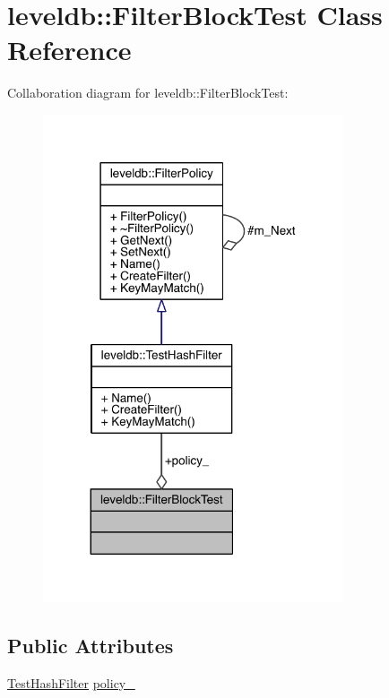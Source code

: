 \hypertarget{classleveldb_1_1_filter_block_test}{}\section{leveldb\+:\+:Filter\+Block\+Test Class Reference}
\label{classleveldb_1_1_filter_block_test}


Collaboration diagram for leveldb\+:\+:Filter\+Block\+Test\+:\nopagebreak
\begin{figure}[H]
\begin{center}
\leavevmode
\includegraphics[width=251pt]{classleveldb_1_1_filter_block_test__coll__graph}
\end{center}
\end{figure}
\subsection*{Public Attributes}
\begin{DoxyCompactItemize}
\item 
\hyperlink{classleveldb_1_1_test_hash_filter}{Test\+Hash\+Filter} \hyperlink{classleveldb_1_1_filter_block_test_ae52fe0fab92f8efc0c078b117cf43e67}{policy\+\_\+}
\end{DoxyCompactItemize}


